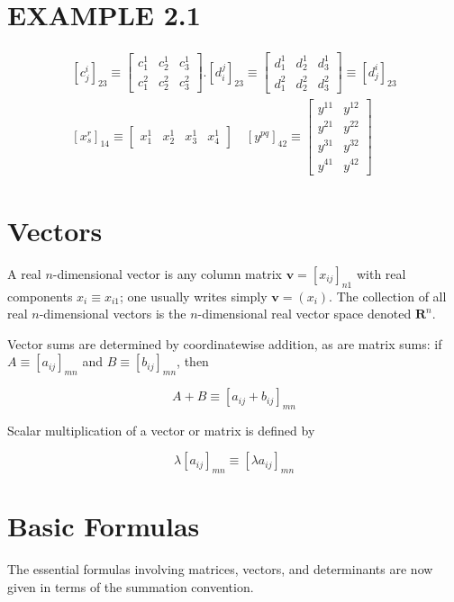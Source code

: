 \documentclass[10pt]{article}
\begin{document}
\section*{EXAMPLE 2.1}
$$
\begin{array}{r}
{\left[c_{j}^{i}\right]_{23} \equiv\left[\begin{array}{lll}
c_{1}^{1} & c_{2}^{1} & c_{3}^{1} \\
c_{1}^{2} & c_{2}^{2} & c_{3}^{2}
\end{array}\right] .\left[d_{i}^{j}\right]_{23} \equiv\left[\begin{array}{lll}
d_{1}^{1} & d_{2}^{1} & d_{3}^{1} \\
d_{1}^{2} & d_{2}^{2} & d_{3}^{2}
\end{array}\right] \equiv\left[d_{j}^{i}\right]_{23}} \\
{\left[x_{s}^{r}\right]_{14} \equiv\left[\begin{array}{llll}
x_{1}^{1} & x_{2}^{1} & x_{3}^{1} & x_{4}^{1}
\end{array}\right] \quad\left[y^{p q}\right]_{42} \equiv\left[\begin{array}{ll}
y^{11} & y^{12} \\
y^{21} & y^{22} \\
y^{31} & y^{32} \\
y^{41} & y^{42}
\end{array}\right]}
\end{array}
$$

\section*{Vectors}
A real $n$-dimensional vector is any column matrix $\mathbf{v}=\left[x_{i j}\right]_{n 1}$ with real components $x_{i} \equiv x_{i 1}$; one usually writes simply $\mathbf{v}=\left(x_{i}\right)$. The collection of all real $n$-dimensional vectors is the $n$-dimensional real vector space denoted $\mathbf{R}^{n}$.

Vector sums are determined by coordinatewise addition, as are matrix sums: if $A \equiv\left[a_{i j}\right]_{m n}$ and $B \equiv\left[b_{i j}\right]_{m n}$, then

$$
A+B \equiv\left[a_{i j}+b_{i j}\right]_{m n}
$$

Scalar multiplication of a vector or matrix is defined by

$$
\lambda\left[a_{i j}\right]_{m n} \equiv\left[\lambda a_{i j}\right]_{m n}
$$

\section*{Basic Formulas}
The essential formulas involving matrices, vectors, and determinants are now given in terms of the summation convention.
\end{document}
